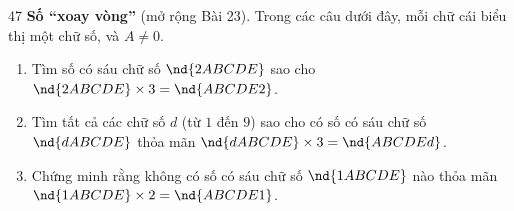 \begin{probbox}{47}{}
\textbf{Số ``xoay vòng''} (mở rộng Bài 23). Trong các câu dưới đây, mỗi chữ cái biểu thị một chữ số, và $A\neq 0$.
\begin{enumerate}[label=\alph*),leftmargin=1.6em,itemsep=1pt]
\item Tìm số có sáu chữ số $\nd{2ABCDE}$ sao cho $\nd{2ABCDE}\times 3=\nd{ABCDE2}$.
\item Tìm tất cả các chữ số $d$ (từ $1$ đến $9$) sao cho có số có sáu chữ số $\nd{dABCDE}$ thỏa mãn $\nd{dABCDE}\times 3=\nd{ABCDEd}$.
\item Chứng minh rằng không có số có sáu chữ số $\nd{1ABCDE}$ nào thỏa mãn $\nd{1ABCDE}\times 2=\nd{ABCDE1}$.
\end{enumerate}
\end{probbox}
